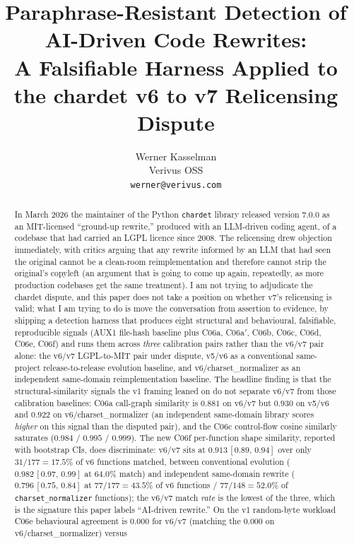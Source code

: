 \documentclass[11pt,letterpaper]{article}
\title{\bfseries Paraphrase-Resistant Detection of AI-Driven Code Rewrites:\\
A Falsifiable Harness Applied to the chardet v6 to v7 Relicensing Dispute}
\author{
  Werner Kasselman \\
  Verivus OSS \\
  \texttt{werner@verivus.com}
}
\date{}
\begin{document}
\maketitle

\begin{abstract}
In March 2026 the maintainer of the Python \texttt{chardet} library
released version 7.0.0 as an MIT-licensed ``ground-up rewrite,''
produced with an LLM-driven coding agent, of a codebase that had
carried an LGPL licence since 2008. The relicensing drew objection
immediately, with critics arguing that any rewrite informed by an
LLM that had seen the original cannot be a clean-room
reimplementation and therefore cannot strip the original's
copyleft (an argument that is going to come up again, repeatedly,
as more production codebases get the same treatment). I am not
trying to adjudicate the chardet dispute, and this paper does not
take a position on whether v7's relicensing is valid; what I am
trying to do is move the conversation from assertion to evidence,
by shipping a detection harness that produces eight structural and
behavioural, falsifiable, reproducible signals (AUX1 file-hash
baseline plus C06a, C06a$'$, C06b, C06c, C06d, C06e, C06f) and runs
them across \emph{three} calibration pairs rather than the v6/v7 pair
alone: the v6/v7 LGPL-to-MIT pair under dispute, v5/v6 as a
conventional same-project release-to-release evolution baseline, and
v6/charset\_normalizer as an independent same-domain reimplementation
baseline. The headline finding is that the structural-similarity
signals the v1 framing leaned on do not separate v6/v7 from those
calibration baselines: C06a call-graph similarity is $0.881$ on
v6/v7 but $0.930$ on v5/v6 and $0.922$ on v6/charset\_normalizer
(an independent same-domain library scores \emph{higher} on this
signal than the disputed pair), and the C06c control-flow cosine
similarly saturates ($0.984$ / $0.995$ / $0.999$). The new C06f
per-function shape similarity, reported with bootstrap CIs, does
discriminate: v6/v7 sits at $0.913\,[0.89,\,0.94]$ over only
$31/177=17.5\%$ of v6 functions matched, between conventional
evolution ($0.982\,[0.97,\,0.99]$ at $64.0\%$ match) and
independent same-domain rewrite ($0.796\,[0.75,\,0.84]$ at
$77/177=43.5\%$ of v6 functions / $77/148=52.0\%$ of
\texttt{charset\_normalizer} functions); the v6/v7 match \emph{rate}
is the lowest of the three,
which is the signature this paper labels ``AI-driven rewrite.'' On
the v1 random-byte workload C06e behavioural agreement is $0.000$
for v6/v7 (matching the $0.000$ on v6/charset\_normalizer) versus

\end{abstract}
\end{document}
